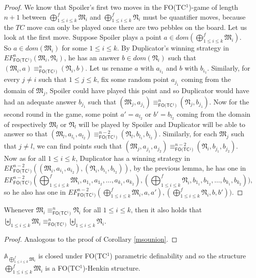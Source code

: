 \documentclass{LMCS}
\newcommand{\frM}{\mathfrak{M}}
\newcommand{\frN}{\mathfrak{N}}
\newcommand{\fotc}{\textsf{FO(TC$^1$)}\xspace}
\begin{document}
\begin{proof}
We know that Spoiler's first two moves in
the \fotc-game of length $n+1$ between $\bigoplus_{1\leq i\leq k}^f \frM_i$ and
$\bigoplus_{1\leq i\leq k}^f \frN_i$ must be quantifier
moves, because the $TC$ move can only be played once there are two
pebbles on the board. Let us look at the first move. Suppose
Spoiler plays a point $a\in dom(\bigoplus_{1\leq i\leq k}^f
\frM_i)$. So $a \in dom(\frM_i)$ for some $1 \leq i \leq k$. By
Duplicator's winning strategy in $EF_\fotc^n(\frM_i, \frN_i)$, he
has an answer $b \in dom(\frN_i)$ such that $(\frM_i,a)
\equiv_\fotc^n (\frN_i,b)$. Let us rename $a$ with $a_{i_1}$ and
$b$ with $b_{i_1}$. Similarly, for every $j\neq i$ such that $1
\leq j \leq k$, fix some random point $a_{j_1}$ coming from the
domain of $\frM_j$, Spoiler could have played this point and so
Duplicator would have had an adequate answer $b_{j_1}$ such that
$(\frM_j,a_{j_1}) \equiv_\fotc^n (\frN_j,b_{j_1})$. Now for the
second round in the game, some point $a'=a_{l_2}$ or $b'=b_{l_2}$
coming from the domain of respectively $\frM_l$ or $\frN_l$ will
be played by Spoiler and Duplicator will be able to answer so that
$(\frM_l,a_{l_1},a_{l_2}) \equiv_\fotc^{n-2}
(\frN_l,b_{l_1},b_{l_2})$. Similarly, for each $\frM_j$ such that
$j \neq l$, we can find points such that $(\frM_j,a_{j_1},a_{j_2})
\equiv_\fotc^{n-2} (\frN_i,b_{j_1},b_{j_2})$. Now as for all $1
\leq i \leq k$, Duplicator has a winning strategy in
$EF_\fotc^{n-2}((\frM_i,a_{i_1},a_{i_2}),(\frN_i,b_{i_1},b_{i_2}))$,
by the previous lemma, he has one in
$$EF_\fotc^{n-2}(\bigoplus_{1\leq i\leq k}^f \frM_i, a_{1_1},
a_{1_2}, \ldots, a_{k_1}, a_{k_2}),(\bigoplus_{1\leq i\leq
k}^f \frN_i, b_{1_1}, b_{1_2}, \ldots, b_{k_1}, b_{k_2})),$$ so
he also has one in $EF_\fotc^{n-2}(\bigoplus_{1\leq i\leq k}^f
\frM_i, a, a'),(\bigoplus_{1\leq i\leq k}^f \frN_i, b,
b'))$.
\end{proof}

\begin{cor}
Whenever $\frM_i\equiv_\fotc^n\frN_i$ for all $1 \leq i \leq k$,
then it also holds that $\biguplus_{ 1 \leq i \leq k} \frM_i\equiv_\fotc^n
\biguplus_{ 1 \leq i \leq k} \frN_i$.\label{fotcunion}
\end{cor}

\begin{proof}
Analogous to the proof of Corollary \ref{msounion}.
\end{proof}


\begin{cor}
$\mathbb{A}_{\bigoplus_{1\leq i\leq k}^f \frM_i}$ is closed
under \fotc parametric definability and so the structure $\bigoplus_{1\leq i\leq
k}^f\frM_i$ is a \fotc-Henkin
structure.\label{fotchenkinfusion}
\end{cor}
\end{document}
